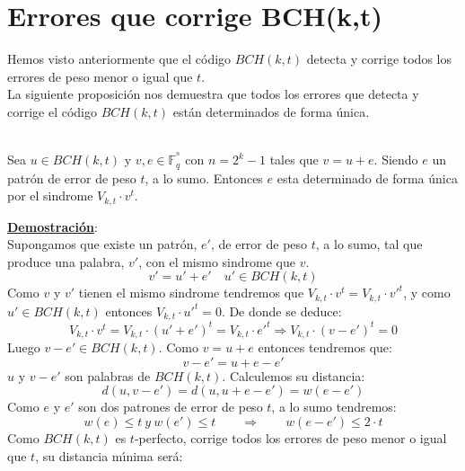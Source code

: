%
%

\section{Errores que corrige BCH(k,t)}

Hemos visto anteriormente que el c\'odigo $BCH(k,t)$ detecta y corrige todos
los errores de peso menor o igual que $t$.\\

La siguiente proposici\'on nos demuestra que todos los errores que detecta y
corrige el c\'odigo $BCH(k,t)$ est\'an determinados de forma \'unica.
%
%
\begin{proposicion}
\ \\
Sea $u\in BCH(k,t)$ y $v,e\in\mathbb{F}^{^n}_q$ con $n=2^k-1$ tales que $v=u+e$.
Siendo $e$ un patr\'on de error de peso $t$, a lo sumo. Entonces $e$ esta 
determinado de forma \'unica por el sindrome $V_{k,t}\cdot v^t$.
\end{proposicion}
\underline{\textbf{Demostraci\'on}}:\\
Supongamos que existe un patr\'on, $e'$, de error de peso $t$, a lo sumo,
tal que produce una palabra, $v'$, con el mismo sindrome que $v$.
\begin{displaymath}
v'=u'+e'\quad u'\in BCH(k,t)
\end{displaymath}
Como $v$ y $v'$ tienen el mismo sindrome tendremos que $V_{k,t}\cdot v^t =
V_{k,t}\cdot v'^t$, y como $u'\in BCH(k,t)$ entonces $V_{k,t}\cdot u'^t=0$. De
donde se deduce:
\begin{displaymath}
V_{k,t}\cdot v^t = V_{k,t}\cdot (u'+e')^t = V_{k,t}\cdot e'^t \Longrightarrow
V_{k,t}\cdot (v-e')^t = 0
\end{displaymath}
Luego $v-e'\in BCH(k,t)$. Como $v=u+e$ entonces tendremos que:
\begin{displaymath}
v-e'=u+e-e'
\end{displaymath}
$u$ y $v-e'$ son palabras de $BCH(k,t)$. Calculemos su distancia:
\begin{displaymath}
d(u,v-e') = d(u,u+e-e') = w(e-e')
\end{displaymath}
Como $e$ y $e'$ son dos patrones de error de peso $t$, a lo sumo tendremos:
\begin{displaymath}
w(e)\leq t\ y\ w(e')\leq t\qquad \Longrightarrow \qquad w(e-e')\leq 2\cdot t
\end{displaymath}
Como $BCH(k,t)$ es $t$-perfecto, corrige todos los errores de peso menor o
igual que $t$, su distancia m\'{\i}nima ser\'a:
